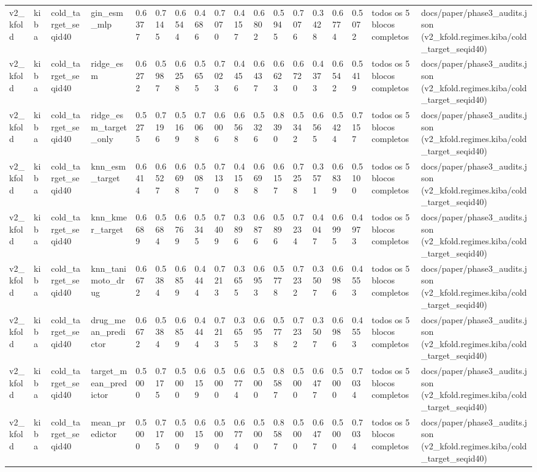 \begin{table}[htbp]
\begin{tabular}{llllllllllllllllll}
v2\_kfold & kiba & cold\_target\_seqid40 & gin\_esm\_mlp & 0.6377 & 0.7145 & 0.6544 & 0.4686 & 0.7070 & 0.4157 & 0.6802 & 0.5945 & 0.7076 & 0.3428 & 0.6774 & 0.5072 & todos os 5 blocos completos & docs/paper/phase3\_audits.json (v2\_kfold.regimes.kiba/cold\_target\_seqid40) \\
v2\_kfold & kiba & cold\_target\_seqid40 & ridge\_esm & 0.6272 & 0.5987 & 0.6258 & 0.5655 & 0.7023 & 0.4456 & 0.6437 & 0.6623 & 0.6720 & 0.4373 & 0.6542 & 0.5419 & todos os 5 blocos completos & docs/paper/phase3\_audits.json (v2\_kfold.regimes.kiba/cold\_target\_seqid40) \\
v2\_kfold & kiba & cold\_target\_seqid40 & ridge\_esm\_target\_only & 0.5275 & 0.7196 & 0.5169 & 0.7068 & 0.6006 & 0.6568 & 0.5326 & 0.8390 & 0.5342 & 0.6565 & 0.5424 & 0.7157 & todos os 5 blocos completos & docs/paper/phase3\_audits.json (v2\_kfold.regimes.kiba/cold\_target\_seqid40) \\
v2\_kfold & kiba & cold\_target\_seqid40 & knn\_esm\_target & 0.6414 & 0.6527 & 0.6698 & 0.5087 & 0.7130 & 0.4158 & 0.6698 & 0.6157 & 0.7258 & 0.3571 & 0.6839 & 0.5100 & todos os 5 blocos completos & docs/paper/phase3\_audits.json (v2\_kfold.regimes.kiba/cold\_target\_seqid40) \\
v2\_kfold & kiba & cold\_target\_seqid40 & knn\_kmer\_target & 0.6689 & 0.5684 & 0.6769 & 0.5345 & 0.7409 & 0.3896 & 0.6876 & 0.5896 & 0.7234 & 0.4047 & 0.6995 & 0.4973 & todos os 5 blocos completos & docs/paper/phase3\_audits.json (v2\_kfold.regimes.kiba/cold\_target\_seqid40) \\
v2\_kfold & kiba & cold\_target\_seqid40 & knn\_tanimoto\_drug & 0.6672 & 0.5384 & 0.6859 & 0.4444 & 0.7213 & 0.3655 & 0.6953 & 0.5778 & 0.7232 & 0.3507 & 0.6986 & 0.4553 & todos os 5 blocos completos & docs/paper/phase3\_audits.json (v2\_kfold.regimes.kiba/cold\_target\_seqid40) \\
v2\_kfold & kiba & cold\_target\_seqid40 & drug\_mean\_predictor & 0.6672 & 0.5384 & 0.6859 & 0.4444 & 0.7213 & 0.3655 & 0.6953 & 0.5778 & 0.7232 & 0.3507 & 0.6986 & 0.4553 & todos os 5 blocos completos & docs/paper/phase3\_audits.json (v2\_kfold.regimes.kiba/cold\_target\_seqid40) \\
v2\_kfold & kiba & cold\_target\_seqid40 & target\_mean\_predictor & 0.5000 & 0.7175 & 0.5000 & 0.6159 & 0.5000 & 0.6774 & 0.5000 & 0.8587 & 0.5000 & 0.6477 & 0.5000 & 0.7034 & todos os 5 blocos completos & docs/paper/phase3\_audits.json (v2\_kfold.regimes.kiba/cold\_target\_seqid40) \\
v2\_kfold & kiba & cold\_target\_seqid40 & mean\_predictor & 0.5000 & 0.7175 & 0.5000 & 0.6159 & 0.5000 & 0.6774 & 0.5000 & 0.8587 & 0.5000 & 0.6477 & 0.5000 & 0.7034 & todos os 5 blocos completos & docs/paper/phase3\_audits.json (v2\_kfold.regimes.kiba/cold\_target\_seqid40) \\

\end{tabular}
\end{table}
